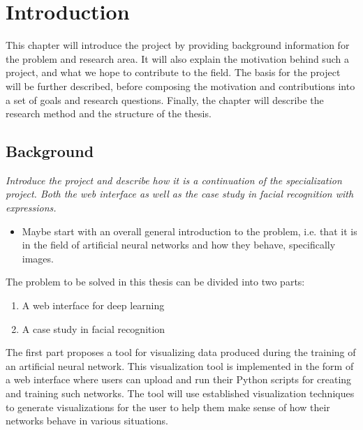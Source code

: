 
\chapter{Introduction}

This chapter will introduce the project by providing background information for the problem and research area. It will also explain the motivation behind such a project, and what we hope to contribute to the field. The basis for the project will be further described, before composing the motivation and contributions into a set of goals and research questions. Finally, the chapter will describe the research method and the structure of the thesis.

\section{Background}

\textit{Introduce the project and describe how it is a continuation of the specialization project. Both the web interface as well as the case study in facial recognition with expressions.}

\begin{itemize}
    \item Maybe start with an overall general introduction to the problem, i.e. that it is in the field of artificial neural networks and how they behave, specifically images.
\end{itemize}

\noindent The problem to be solved in this thesis can be divided into two parts:
\begin{enumerate}
    \item A web interface for deep learning
    \item A case study in facial recognition
\end{enumerate}

\noindent The first part proposes a tool for visualizing data produced during the training of an artificial neural network. This visualization tool is implemented in the form of a web interface where users can upload and run their Python scripts for creating and training such networks. The tool will use established visualization techniques to generate visualizations for the user to help them make sense of how their networks behave in various situations. \\

